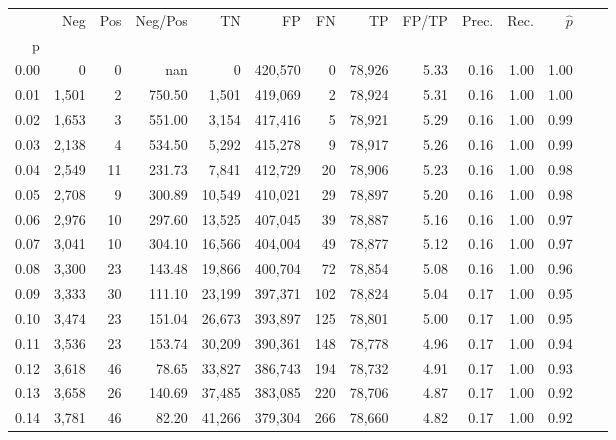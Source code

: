 \begin{tabular}{rrrrrrrrrrrrrr}
\toprule
{} &    Neg &    Pos & Neg/Pos &       TN &       FP &      FN &      TP & FP/TP & Prec. &  Rec. & $\hat{p}$ \\
p    &        &        &         &          &          &         &         &       &       &       &           \\
\midrule
0.00 &      0 &      0 &     nan &        0 &  420,570 &       0 &  78,926 &  5.33 &  0.16 &  1.00 &      1.00 \\
0.01 &  1,501 &      2 &  750.50 &    1,501 &  419,069 &       2 &  78,924 &  5.31 &  0.16 &  1.00 &      1.00 \\
0.02 &  1,653 &      3 &  551.00 &    3,154 &  417,416 &       5 &  78,921 &  5.29 &  0.16 &  1.00 &      0.99 \\
0.03 &  2,138 &      4 &  534.50 &    5,292 &  415,278 &       9 &  78,917 &  5.26 &  0.16 &  1.00 &      0.99 \\
0.04 &  2,549 &     11 &  231.73 &    7,841 &  412,729 &      20 &  78,906 &  5.23 &  0.16 &  1.00 &      0.98 \\
0.05 &  2,708 &      9 &  300.89 &   10,549 &  410,021 &      29 &  78,897 &  5.20 &  0.16 &  1.00 &      0.98 \\
0.06 &  2,976 &     10 &  297.60 &   13,525 &  407,045 &      39 &  78,887 &  5.16 &  0.16 &  1.00 &      0.97 \\
0.07 &  3,041 &     10 &  304.10 &   16,566 &  404,004 &      49 &  78,877 &  5.12 &  0.16 &  1.00 &      0.97 \\
0.08 &  3,300 &     23 &  143.48 &   19,866 &  400,704 &      72 &  78,854 &  5.08 &  0.16 &  1.00 &      0.96 \\
0.09 &  3,333 &     30 &  111.10 &   23,199 &  397,371 &     102 &  78,824 &  5.04 &  0.17 &  1.00 &      0.95 \\
0.10 &  3,474 &     23 &  151.04 &   26,673 &  393,897 &     125 &  78,801 &  5.00 &  0.17 &  1.00 &      0.95 \\
0.11 &  3,536 &     23 &  153.74 &   30,209 &  390,361 &     148 &  78,778 &  4.96 &  0.17 &  1.00 &      0.94 \\
0.12 &  3,618 &     46 &   78.65 &   33,827 &  386,743 &     194 &  78,732 &  4.91 &  0.17 &  1.00 &      0.93 \\
0.13 &  3,658 &     26 &  140.69 &   37,485 &  383,085 &     220 &  78,706 &  4.87 &  0.17 &  1.00 &      0.92 \\
0.14 &  3,781 &     46 &   82.20 &   41,266 &  379,304 &     266 &  78,660 &  4.82 &  0.17 &  1.00 &      0.92 \\

\end{tabular}
